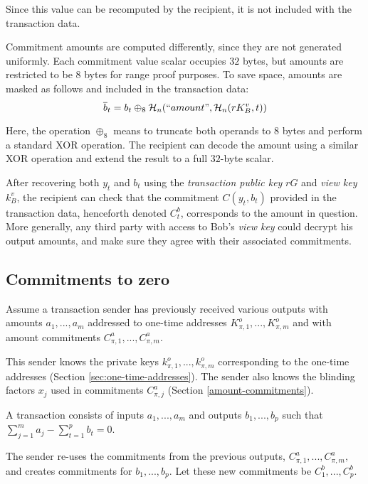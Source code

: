 Since this value can be recomputed by the recipient, it is not included with the transaction data.

Commitment amounts are computed differently, since they are not generated uniformly. Each commitment value scalar occupies $32$ bytes, but amounts are restricted to be $8$ bytes for range proof purposes. To save space, amounts are masked as follows and included in the transaction data:\\
\[\overline{b}_t = b_t \oplus_8 \mathcal{H}_n(``amount",\mathcal{H}_n(r K_B^v, t))\]

Here, the operation $\oplus_8$ means to truncate both operands to $8$ bytes and perform a standard XOR operation. The recipient can decode the amount using a similar XOR operation and extend the result to a full $32$-byte scalar.

After recovering both $y_t$ and $b_t$ using the {\em transaction public key} $r G$ and {\em view key} $k_B^v$, the recipient can check that the commitment $C(y_t,b_t)$ provided in the transaction data, henceforth denoted $C_t^b$, corresponds to the amount in question.\\

More generally, any third party with access to Bob’s {\em view key} could decrypt his output amounts, and make sure they agree with their associated commitments.



\subsection{Commitments to zero}
\label{sec:commitments-to-zero}

Assume a transaction sender has previously received various outputs with amounts $a_1, ..., a_m$ addressed to one-time addresses $K_{\pi,1}^o, ..., K_{\pi,m}^o$ and with amount commitments $C_{\pi,1}^a, ..., C_{\pi,m}^a$.

This sender knows the private keys $k_{\pi,1}^o, ..., k_{\pi,m}^o$ corresponding to the one-time addresses (Section \ref{sec:one-time-addresses}). The sender also knows the blinding factors $x_j$ used in commitments $C_{\pi,j}^a$ (Section \ref{amount-commitments}).

A transaction consists of inputs \(a_1, ..., a_m\) and outputs \(b_1, ..., b_p\) such that \(\sum\limits_{j=1}^m a_j - \sum\limits_{t=1}^p b_t = 0\).

The sender re-uses the commitments from the previous outputs, $C_{\pi,1}^a, ..., C_{\pi,m}^a,$ and creates commitments for $b_1, ..., b_p$. Let these new commitments be $C_1^b, ..., C_p^b$.

